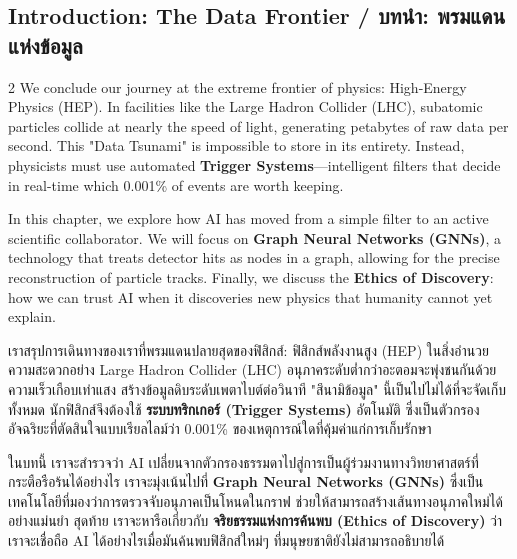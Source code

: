\subsection{Introduction: The Data Frontier \quad / \quad \textthai{บทนำ: พรมแดนแห่งข้อมูล}}
\begin{paracol}{2}
We conclude our journey at the extreme frontier of physics: High-Energy Physics (HEP). In facilities like the Large Hadron Collider (LHC), subatomic particles collide at nearly the speed of light, generating petabytes of raw data per second. This "Data Tsunami" is impossible to store in its entirety. Instead, physicists must use automated \textbf{Trigger Systems}—intelligent filters that decide in real-time which 0.001\% of events are worth keeping.

In this chapter, we explore how AI has moved from a simple filter to an active scientific collaborator. We will focus on \textbf{Graph Neural Networks (GNNs)}, a technology that treats detector hits as nodes in a graph, allowing for the precise reconstruction of particle tracks. Finally, we discuss the \textbf{Ethics of Discovery}: how we can trust AI when it discoveries new physics that humanity cannot yet explain.

\switchcolumn

\begin{thai}
เราสรุปการเดินทางของเราที่พรมแดนปลายสุดของฟิสิกส์: ฟิสิกส์พลังงานสูง (HEP) ในสิ่งอำนวยความสะดวกอย่าง Large Hadron Collider (LHC) อนุภาคระดับต่ำกว่าอะตอมจะพุ่งชนกันด้วยความเร็วเกือบเท่าแสง สร้างข้อมูลดิบระดับเพตาไบต์ต่อวินาที "สึนามิข้อมูล" นี้เป็นไปไม่ได้ที่จะจัดเก็บทั้งหมด นักฟิสิกส์จึงต้องใช้ \textbf{ระบบทริกเกอร์ (Trigger Systems)} อัตโนมัติ ซึ่งเป็นตัวกรองอัจฉริยะที่ตัดสินใจแบบเรียลไลม์ว่า 0.001\% ของเหตุการณ์ใดที่คุ้มค่าแก่การเก็บรักษา

ในบทนี้ เราจะสำรวจว่า AI เปลี่ยนจากตัวกรองธรรมดาไปสู่การเป็นผู้ร่วมงานทางวิทยาศาสตร์ที่กระตือรือร้นได้อย่างไร เราจะมุ่งเน้นไปที่ \textbf{Graph Neural Networks (GNNs)} ซึ่งเป็นเทคโนโลยีที่มองว่าการตรวจจับอนุภาคเป็นโหนดในกราฟ ช่วยให้สามารถสร้างเส้นทางอนุภาคใหม่ได้อย่างแม่นยำ สุดท้าย เราจะหารือเกี่ยวกับ \textbf{จริยธรรมแห่งการค้นพบ (Ethics of Discovery)} ว่าเราจะเชื่อถือ AI ได้อย่างไรเมื่อมันค้นพบฟิสิกส์ใหม่ๆ ที่มนุษยชาติยังไม่สามารถอธิบายได้
\end{thai}
\end{paracol}
